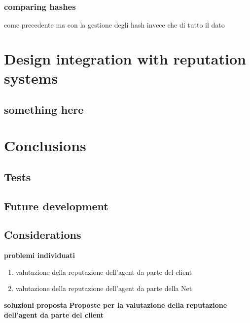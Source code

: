 \documentclass[]{article}
\begin{document}
		\subsubsection{comparing hashes}
		come precedente ma con la gestione degli hash invece che di tutto il dato


	\section{Design integration with reputation systems}
	
	\subsection{something here}
	
		
\section{Conclusions}
	\subsection{Tests}
	\subsection{Future development}
	\subsection{Considerations}

	\pagebreak

	\textbf{problemi individuati}
	\begin{enumerate}
		\item valutazione della reputazione dell'agent da parte del client
		\item valutazione della reputazione dell'agent da parte della Net
	\end{enumerate}
	
	\textbf{soluzioni proposta}
	\textbf{Proposte per la valutazione della reputazione dell'agent da parte del client}
	
\end{document}
